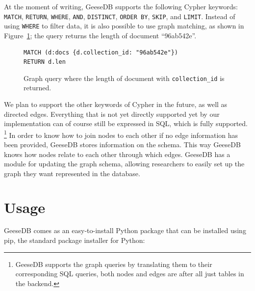 At the moment of writing, GeeseDB supports the following Cypher keywords: \texttt{MATCH}, \texttt{RETURN}, \texttt{WHERE}, \texttt{AND}, \texttt{DISTINCT}, \texttt{ORDER BY}, \texttt{SKIP}, and \texttt{LIMIT}. Instead of using \texttt{WHERE} to filter data, it is also possible to use graph matching, as shown in Figure~\ref{fig:graph_query2}; the query returns the length of document ``96ab542e''. 
\begin{figure}
	\begin{verbatim}
MATCH (d:docs {d.collection_id: "96ab542e"})
RETURN d.len
	\end{verbatim}
	\caption{Graph query where the length of document with \texttt{collection\_id} is returned.}
	\label{fig:graph_query2}
\end{figure}
We plan to support the other keywords of Cypher in the future, as well as directed edges. Everything that is not yet directly supported yet by our implementation can of course still be expressed in SQL, which is fully supported. \footnote{GeeseDB supports the graph queries by translating them to their corresponding SQL queries, both nodes and edges are after all just tables in the backend.} In order to know how to join nodes to each other if no edge information has been provided, GeeseDB stores information on the schema. This way GeeseDB knows how nodes relate to each other through which edges. GeeseDB has a module for updating the graph schema, allowing researchers to easily set up the graph they want represented in the database.

\section{Usage}
GeeseDB comes as an easy-to-install Python package that can be installed using pip, the standard package installer for Python:

